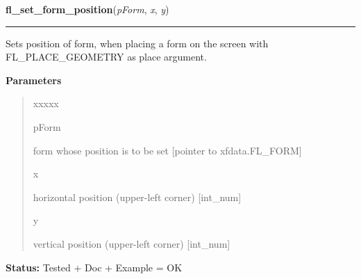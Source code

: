     \label{xformslib:library:fl_set_form_position}

    \vspace{0.5ex}

\hspace{.8\funcindent}\begin{boxedminipage}{\funcwidth}

    \raggedright \textbf{fl\_set\_form\_position}(\textit{pForm}, \textit{x}, \textit{y})

    \vspace{-1.5ex}

    \rule{\textwidth}{0.5\fboxrule}
\setlength{\parskip}{2ex}
    Sets position of form, when placing a form on the screen with 
    FL\_PLACE\_GEOMETRY as place argument.

\setlength{\parskip}{1ex}
      \textbf{Parameters}
      \vspace{-1ex}

      \begin{quote}
        \begin{Ventry}{xxxxx}

          \item[pForm]

          form whose position is to be set [pointer to xfdata.FL\_FORM]

          \item[x]

          horizontal position (upper-left corner) [int\_num]

          \item[y]

          vertical position (upper-left corner) [int\_num]

        \end{Ventry}

      \end{quote}

\textbf{Status:} Tested + Doc + Example = OK



    \end{boxedminipage}

    \label{xformslib:library:fl_set_form_title}

    \vspace{0.5ex}

